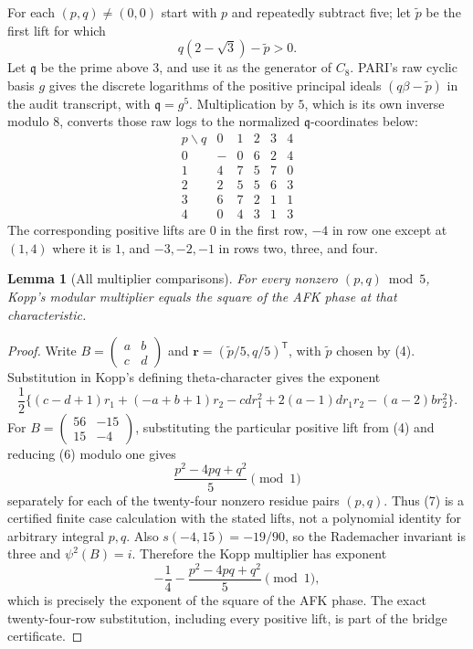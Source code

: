 \documentclass[11pt]{article}
\newtheorem{lemma}[theorem]{Lemma}
\begin{document}
For each $(p,q)\ne(0,0)$ start with $p$ and repeatedly subtract five;
let $\widetilde p$ be the first lift for which
\[
 q(2-\sqrt3)-\widetilde p>0.
\tag{4}
\]
Let $\mathfrak q$ be the prime above $3$, and use it as the generator
of $C_8$.  PARI's raw cyclic basis $g$ gives the discrete logarithms
of the positive principal ideals $(q\beta-\widetilde p)$ in the audit
transcript, with $\mathfrak q=g^5$.  Multiplication by $5$, which is
its own inverse modulo $8$, converts those raw logs to the normalized
$\mathfrak q$-coordinates below:
\[
\begin{array}{c|ccccc}
p\backslash q&0&1&2&3&4\\ \hline
0&-&0&6&2&4\\
1&4&7&5&7&0\\
2&2&5&5&6&3\\
3&6&7&2&1&1\\
4&0&4&3&1&3
\end{array}
\tag{5}
\]
The corresponding positive lifts are
$0$ in the first row, $-4$ in row one except at $(1,4)$ where it is
$1$, and $-3,-2,-1$ in rows two, three, and four.

\begin{lemma}[All multiplier comparisons]\label{lem:multiplier}
For every nonzero $(p,q)\bmod5$, Kopp's modular multiplier equals
the square of the AFK phase at that characteristic.
\end{lemma}

\begin{proof}
Write $B=(\begin{smallmatrix}a&b\\c&d\end{smallmatrix})$ and
$\boldsymbol r=(\widetilde p/5,q/5)^{\mathsf T}$, with
$\widetilde p$ chosen by (4).  Substitution in Kopp's defining
theta-character gives the exponent
\[
\frac12\{(c-d+1)r_1+(-a+b+1)r_2-cd r_1^2
+2(a-1)d r_1r_2-(a-2)b r_2^2\}.
\tag{6}
\]
For $B=(\begin{smallmatrix}56&-15\\15&-4\end{smallmatrix})$, substituting
the particular positive lift from (4) and reducing (6) modulo one gives
\[
 \frac{p^2-4pq+q^2}{5}\pmod1
\tag{7}
\]
separately for each of the twenty-four nonzero residue pairs $(p,q)$.
Thus (7) is a certified finite case calculation with the stated lifts,
not a polynomial identity for arbitrary integral $p,q$.  Also
$s(-4,15)=-19/90$, so the Rademacher invariant is three and
$\psi^2(B)=i$.  Therefore the Kopp multiplier has exponent
\[
 -\frac14-\frac{p^2-4pq+q^2}{5}\pmod1,
\tag{8}
\]
which is precisely the exponent of the square of the AFK phase.
The exact twenty-four-row substitution, including every positive lift,
is part of the bridge certificate.
\end{proof}
\end{document}
